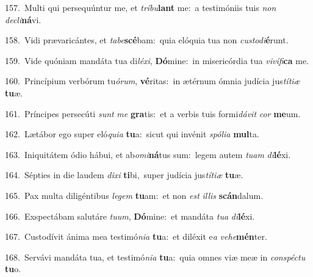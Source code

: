 {\numbfont\textcolor{\numbcolor}{157.}}~Multi qui persequúntur me, et \textit{trí}\-\textit{bu}\textbf{lant} me:~\star a testimóniis tuis \textit{non} \textit{de}\-\textit{cli}\textbf{ná}vi.\par
{\numbfont\textcolor{\numbcolor}{158.}}~Vidi prævaricántes, et \textit{ta}\-\textit{be}\textbf{scé}bam:~\star quia elóquia tua non \textit{cus}\-\textit{to}\textit{di}\textbf{é}runt.\par
{\numbfont\textcolor{\numbcolor}{159.}}~Vide quóniam mandáta tua di\-\textit{lé}\-\textit{xi}, \textbf{Dó}\-mine:~\star in misericórdia tua \textit{vi}\-\textit{ví}\textit{fi}\textbf{ca} me.\par
{\numbfont\textcolor{\numbcolor}{160.}}~Princípium verbórum tu\-\textit{ó}\-\textit{rum}, \textbf{vé}\-ritas:~\star in ætérnum ómnia judícia jus\-\textit{tí}\-\textit{ti}\textit{æ} \textbf{tu}\-æ.\par
{\numbfont\textcolor{\numbcolor}{161.}}~Príncipes persecúti \textit{sunt} \textit{me} \textbf{gra}\-tis:~\star et a verbis tuis formi\-\textit{dá}\-\textit{vit} \textit{cor} \textbf{me}\-um.\par
{\numbfont\textcolor{\numbcolor}{162.}}~Lætábor ego super eló\-\textit{qui}\-\textit{a} \textbf{tu}\-a:~\star sicut qui invénit \textit{spó}\-\textit{li}\textit{a} \textbf{mul}\-ta.\par
{\numbfont\textcolor{\numbcolor}{163.}}~Iniquitátem ódio hábui, et ab\-\textit{o}\-\textit{mi}\textbf{ná}tus sum:~\star legem autem \textit{tu}\-\textit{am} \textit{di}\-\textbf{lé}xi.\par
{\numbfont\textcolor{\numbcolor}{164.}}~Sépties in die laudem \textit{di}\-\textit{xi} \textbf{ti}\-bi,~\star super judícia jus\-\textit{tí}\-\textit{ti}\textit{æ} \textbf{tu}\-æ.\par
{\numbfont\textcolor{\numbcolor}{165.}}~Pax multa diligéntibus \textit{le}\-\textit{gem} \textbf{tu}\-am:~\star et non \textit{est} \textit{il}\-\textit{lis} \textbf{scán}\-dalum.\par
{\numbfont\textcolor{\numbcolor}{166.}}~Exspectábam salutáre \textit{tu}\-\textit{um}, \textbf{Dó}\-mine:~\star et mandáta \textit{tu}\-\textit{a} \textit{di}\-\textbf{lé}xi.\par
{\numbfont\textcolor{\numbcolor}{167.}}~Custodívit ánima mea testimó\-\textit{ni}\-\textit{a} \textbf{tu}\-a:~\star et diléxit e\textit{a} \textit{ve}\-\textit{he}\textbf{mén}ter.\par
{\numbfont\textcolor{\numbcolor}{168.}}~Servávi mandáta tua, et testimó\-\textit{ni}\-\textit{a} \textbf{tu}\-a:~\star quia omnes viæ meæ in \textit{con}\-\textit{spéc}\textit{tu} \textbf{tu}\-o.\par
